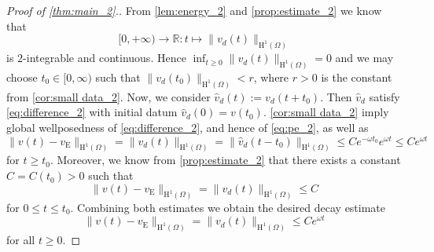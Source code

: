 \documentclass[preprint]{elsarticle}
\newtheorem{cor}[cor]{Corollary}
\numberwithin{equation}{section}
\newcommand {\R}	{\mathbb{R}}
\newcommand {\E}	{\mathbb{E}}
\renewcommand{\H}{\mathrm{H}}
\newcommand{\sigmabar}{\bar{\sigma}}
\newcommand{\sssigmabar}[1]{{#1}_{\sigmabar}}
\renewcommand{\bar}[1]{\overline{#1}}
\newcommand{\rL}{\mathrm{L}}
\newcommand{\rH}{\H}
\newcommand{\rB}{\mathrm{B}}
\newcommand{\rE}{\mathrm{E}}
\newcommand{\rLsigmabar}{\sssigmabar{\rL}}
\newcommand{\rBrpq}[3]{\rB^{{#1}}_{{#2}{#3}}}
\newcommand{\rLqsigmabar}{\rLsigmabar^q}
\newcommand{\btb}{\color{black}}
\newcommand{\etb}{\color{black}}
\begin{document}
\begin{proof}[Proof of \autoref{thm:main_2}.]
	From \autoref{lem:energy_2} and \autoref{prop:estimate_2} we know that 
	\begin{equation*}
		[0,+\infty) \to \R \colon t \mapsto \| v_d(t) \|_{\rH^1(\Omega)}
	\end{equation*}
	is $2$-integrable and continuous. 
	Hence $\inf_{t \geq 0} \| v_d(t) \|_{\rH^1(\Omega)} = 0$ and we may choose $t_0 \in [0,\infty)$ such that $\| v_d(t_0) \|_{\rH^1(\Omega)} <r$, where $r > 0$ is the constant from \autoref{cor:small data_2}.
	Now, we consider $\hat{v}_d(t) := v_d(t+t_0)$. Then $\hat{v}_d$ satisfy \eqref{eq:difference_2} with initial datum $\hat{v}_d(0) = v(t_0)$.
	\autoref{cor:small data_2} imply  global wellposedness of \eqref{eq:difference_2}, and hence of \eqref{eq:pe_2}, as well as
	\begin{equation*}
		\| v(t) - v_{\rE} \|_{\rH^1(\Omega)}
		= 
		\| v_d(t) \|_{\rH^1(\Omega)}
		= \| \hat{v}_d(t-t_0) \|_{\rH^1(\Omega)}
		\leq C e^{-\omega t_0} e^{\omega t}
		\leq C e^{\omega t}
	\end{equation*}  
	for $t \geq t_0$. Moreover, we know from \autoref{prop:estimate_2} that there exists a constant $C = C(t_0) > 0$ such that 
	\begin{equation*}
		\| v(t) - v_{\rE} \|_{\rH^1(\Omega)}
		= 
		\| v_d(t) \|_{\rH^1(\Omega)}
		\leq C 
	\end{equation*}
	for $0 \leq t \leq t_0$. Combining both estimates we obtain the desired decay estimate
	\begin{equation*}
		\| v(t) - v_{\rE} \|_{\rH^1(\Omega)}
		= 
		\| v_d(t) \|_{\rH^1(\Omega)}
		\leq C e^{\omega t}
	\end{equation*}  
	for all $t \geq 0$. 
\end{proof}


%
%
\end{document}
